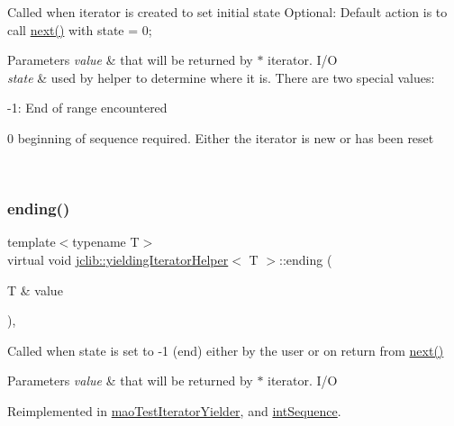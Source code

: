 Called when iterator is created to set initial state Optional\+: Default action is to call \hyperlink{classjclib_1_1yieldingIteratorHelper_a620c17e7eb8ed695e3fb9add01da576d}{next()} with state = 0; 
\begin{DoxyParams}{Parameters}
{\em value} & that will be returned by $\ast$ iterator. I/O \\
\hline
{\em state} & used by helper to determine where it is. There are two special values\+:
\begin{DoxyItemize}
\item -\/1\+: End of range encountered 
\item 0 beginning of sequence required. Either the iterator is new or has been reset
\end{DoxyItemize}\\
\hline
\end{DoxyParams}
\mbox{\label{classjclib_1_1yieldingIteratorHelper_a62f77cf3f5376e5997512907460f2d36}} 
\subsubsection{\texorpdfstring{ending()}{ending()}}
{\footnotesize\ttfamily template$<$typename T$>$ \\
virtual void \hyperlink{classjclib_1_1yieldingIteratorHelper}{jclib\+::yielding\+Iterator\+Helper}$<$ T $>$\+::ending (\begin{DoxyParamCaption}\item[{T \&}]{value }\end{DoxyParamCaption})\hspace{0.3cm}{\ttfamily [inline]}, {\ttfamily [virtual]}}

Called when state is set to -\/1 (end) either by the user or on return from \hyperlink{classjclib_1_1yieldingIteratorHelper_a620c17e7eb8ed695e3fb9add01da576d}{next()} 
\begin{DoxyParams}{Parameters}
{\em value} & that will be returned by $\ast$ iterator. I/O \\
\hline
\end{DoxyParams}


Reimplemented in \hyperlink{classmaoTestIteratorYielder_aac4528a277c8ee351b97131d861ec11d}{mao\+Test\+Iterator\+Yielder}, and \hyperlink{classintSequence_a4bf1fa808b4b4e4a5a618325d73df0c6}{int\+Sequence}.

